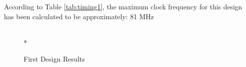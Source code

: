 According to Table \ref{tab:timing1}, the maximum clock frequency for this design has been calculated to be approximately: 81 MHz

\begin{figure}[htp]
  \begin{center}
     \\*
  \end{center}
  \caption{First Design Results}
  \label{fig:design1_results}
\end{figure}